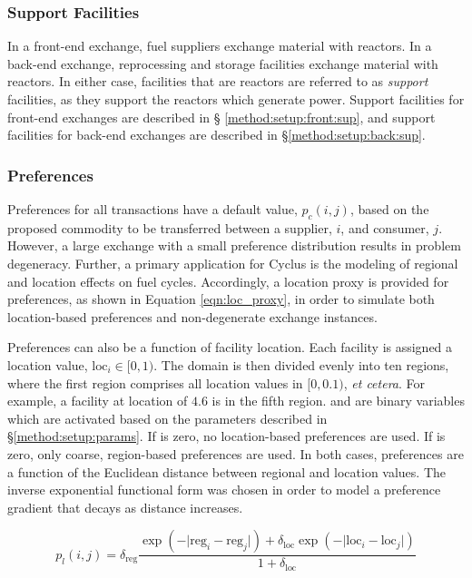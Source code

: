 \subsubsection{Support Facilities}

In a front-end exchange, fuel suppliers exchange material with reactors. In a
back-end exchange, reprocessing and storage facilities exchange material with
reactors. In either case, facilities that are  reactors are referred
to as \textit{support} facilities, as they support the reactors which generate
power. Support facilities for front-end exchanges are described in \S
\ref{method:setup:front:sup}, and support facilities for back-end exchanges are
described in \S \ref{method:setup:back:sup}.

\subsubsection{Preferences}\label{method:setup:features:prefs}

Preferences for all transactions have a default value, $p_{c}(i, j)$, based on
the proposed commodity to be transferred between a supplier, $i$, and consumer,
$j$. However, a large exchange with a small preference distribution results in
problem degeneracy. Further, a primary application for Cyclus is the modeling of
regional and location effects on fuel cycles. Accordingly, a location proxy is
provided for preferences, as shown in Equation \ref{eqn:loc_proxy}, in order to
simulate both location-based preferences and non-degenerate exchange instances.

Preferences can also be a function of facility location. Each facility is
assigned a location value, $\text{loc}_i \in [0, 1)$. The domain is then
  divided evenly into ten regions, where the first region comprises all location
  values in $[0, 0.1)$, \textit{et cetera}. For example, a facility at location
    of $4.6$ is in the fifth region. \dreg and
    \dloc are binary variables which are activated based on the
    parameters described in \S \ref{method:setup:params}. If
    \dreg is zero, no location-based preferences are used. If
    \dloc is zero, only coarse, region-based preferences are
    used. In both cases, preferences are a function of the Euclidean distance
    between regional and location values. The inverse exponential functional
    form was chosen in order to model a preference gradient that decays as
    distance increases.

\begin{equation}\label{eqn:loc_proxy}
p_{l}(i, j) = \delta_{\text{reg}} 
\frac{\exp(- \lvert \text{reg}_{i} - \text{reg}_{j} \rvert ) + \delta_{\text{loc}}
  \exp(- \lvert \text{loc}_{i} - \text{loc}_{j} \rvert )}
     {1 + \delta_{\text{loc}}}
\end{equation}

